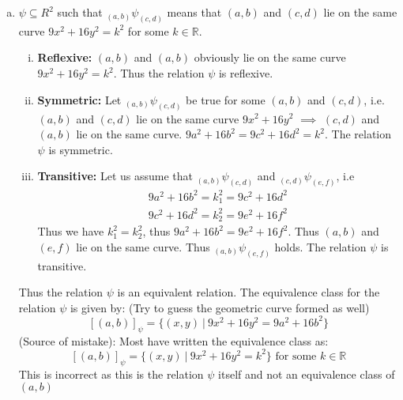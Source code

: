 \documentclass[12pt]{scrartcl}
\begin{document}
\begin{enumerate}[a.]
    \item $\psi \subseteq R^2$ such that $_{(a, b)}\psi_{(c,d)}$ means that $(a,b)$ and $(c,d)$ lie on the same curve $9x^2 + 16y^2 = k^2$ for some $k \in \mathbb{R}$. 
        \begin{enumerate}[i.]
            \item \textbf{Reflexive:} $(a, b)$ and $(a,b)$ obviously lie on the same curve $9x^2 + 16y^2 = k^2$. Thus the relation $\psi$ is reflexive.
            \item \textbf{Symmetric:} Let $_{(a,b)}\psi_{(c,d)}$ be true for some $(a, b)$ and $(c, d)$, i.e. $(a,b)$ and $(c,d)$ lie on the same curve $9x^2 + 16y^2$ $\implies$ $(c,d)$ and $(a,b)$ lie on the same curve. $9a^2 + 16b^2 = 9c^2 + 16d^2 = k^2$. The relation $\psi$ is symmetric.
            \item \textbf{Transitive:} Let us assume that $_{(a,b)}\psi_{(c,d)}$ and $_{(c,d)}\psi_{(e,f)}$, i.e 
            \begin{gather*}
                9a^2 + 16b^2 = k_1^2 = 9c^2 + 16d^2 \\
                9c^2 + 16d^2 = k_2^2 = 9e^2 + 16f^2
            \end{gather*}
            Thus we have $k_1^2 = k_2^2$, thus $9a^2 + 16b^2 = 9e^2 + 16f^2$. Thus $(a, b)$ and $(e, f)$ lie on the same curve. Thus $_{(a,b)}\psi_{(e,f)}$ holds. The relation $\psi$ is transitive. 
        \end{enumerate}
    Thus the relation $\psi$ is an equivalent relation. The equivalence class for the relation $\psi$ is given by: (Try to guess the geometric curve formed as well)
    \[
        [(a, b)]_\psi = \{(x, y)\  |\  9x^2 + 16y^2 = 9a^2 + 16b^2\}
    \]
    (Source of mistake): Most have written the equivalence class as: 
    \[
        [(a, b)]_\psi = \{(x, y)\  |\  9x^2 + 16y^2 = k^2\} \text{ for some $k \in \mathbb{R}$}
    \]
    This is incorrect as this is the relation $\psi$ itself and not an equivalence class of $(a,b)$
\end{enumerate}
\end{document}
